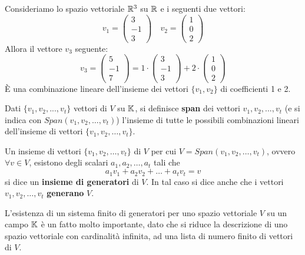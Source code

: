 \begin{example}
	Consideriamo lo spazio vettoriale $\mathbb{R}^3$ su $\mathbb{R}$ e i seguenti due vettori:
	\[
		v_1 = \begin{pmatrix}
			3 \\ -1 \\ 3
		\end{pmatrix}
		\quad
		v_2 = \begin{pmatrix}
			1 \\ 0 \\ 2
		\end{pmatrix}
	\]
	Allora il vettore $v_3$ seguente:
	\[
		v_3 = \begin{pmatrix}
			5 \\ -1 \\ 7
		\end{pmatrix}
		= 1 \cdot \begin{pmatrix}
			3 \\ -1 \\ 3
		\end{pmatrix}
		+ 2 \cdot \begin{pmatrix}
			1 \\ 0 \\ 2
		\end{pmatrix}
	\]
	È una combinazione lineare dell'insieme dei vettori $\{v_1, v_2\}$ di coefficienti 1 e 2.
\end{example}

\begin{definition}
	Dati $\{v_1, v_2, ..., v_t\}$ vettori di $V$ su $\mathbb{K}$, si definisce \textbf{span} dei vettori
	$v_1, v_2, ..., v_t$ (e si indica con $Span(v_1, v_2, \dots, v_t)$) l'insieme di tutte le possibili
	combinazioni lineari dell'insieme di vettori $\{v_1, v_2, \dots, v_t\}$.
\end{definition}

\begin{definition}
	Un insieme di vettori $\{v_1, v_2, \dots, v_t\}$ di $V$ per cui $V = Span(v_1, v_2, \dots, v_t)$, ovvero
	$\forall v \in V$, esistono degli scalari $a_1, a_2, \dots, a_t$ tali che
	\[ a_1 v_1 + a_2 v_2 + \dots + a_t v_t = v \]
	si dice un \textbf{insieme di generatori} di $V$. In tal caso si dice anche che i vettori
	$v_1, v_2, \dots, v_t$ \textbf{generano} $V$.
\end{definition}

L'esistenza di un sistema finito di generatori per uno spazio vettoriale $V$ su un campo $\mathbb{K}$ è un
fatto molto importante, dato che si riduce la descrizione di uno spazio vettoriale con cardinalità infinita,
ad una lista di numero finito di vettori di $V$.

